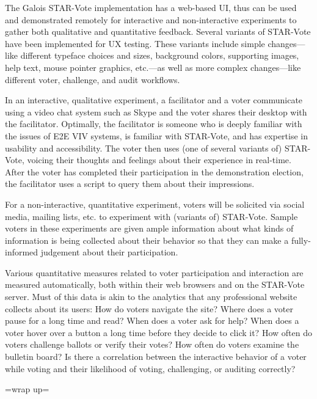 The Galois STAR-Vote implementation has a web-based UI, thus can be
used and demonstrated remotely for interactive and non-interactive
experiments to gather both qualitative and quantitative feedback.
Several variants of STAR-Vote have been implemented for UX testing.
These variants include simple changes---like different typeface
choices and sizes, background colors, supporting images, help text,
mouse pointer graphics, etc.---as well as more complex changes---like
different voter, challenge, and audit workflows.

In an interactive, qualitative experiment, a facilitator and a voter
communicate using a video chat system such as Skype and the voter
shares their desktop with the facilitator. Optimally, the facilitator
is someone who is deeply familiar with the issues of E2E VIV systems,
is familiar with STAR-Vote, and has expertise in usability and
accessibility. The voter then uses (one of several variants of)
STAR-Vote, voicing their thoughts and feelings about their experience
in real-time. After the voter has completed their participation in the
demonstration election, the facilitator uses a script to query them
about their impressions.

For a non-interactive, quantitative experiment, voters will be
solicited via social media, mailing lists, etc. to experiment with
(variants of) STAR-Vote. Sample voters in these experiments are given
ample information about what kinds of information is being collected
about their behavior so that they can make a fully-informed judgement
about their participation.

Various quantitative measures related to voter participation and
interaction are measured automatically, both within their web browsers
and on the STAR-Vote server. Must of this data is akin to the
analytics that any professional website collects about its users: How
do voters navigate the site?  Where does a voter pause for a long time
and read?  When does a voter ask for help?  When does a voter hover
over a button a long time before they decide to click it?  How often
do voters challenge ballots or verify their votes?  How often do
voters examine the bulletin board?  Is there a correlation between the
interactive behavior of a voter while voting and their likelihood of
voting, challenging, or auditing correctly?

=wrap up=



